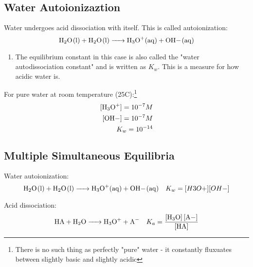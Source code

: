 \documentclass[../CHEM152Notes.tex]{subfiles}
\begin{document}
\subsection*{Water Autoionizaztion}
Water undergoes acid dissociation with itself. This is called autoionization:
\begin{equation*}
    \begin{aligned}
        \ce{H2O_(l) + H2O_(l) -> H3O+_(aq) + OH-_(aq)}
    \end{aligned}
\end{equation*}
\begin{enumerate}
    \item The equilibrium constant in this case is also called the "water autodissociation constant" and is written as $K_w$. This is a measure for how acidic water is.
\end{enumerate}
For pure water at room temperature (25C):\footnote{There is no such thing as perfectly "pure" water - it constantly fluxuates between slightly basic and slightly acidic} 
\begin{equation*}
    \begin{aligned}
        \ce{[H3O+]} = 10^{-7} M \\
        \ce{[OH-]} = 10^{-7} M \\
        K_w = 10^{-14}
    \end{aligned}
\end{equation*}



\subsection*{Multiple Simultaneous Equilibria}
Water autoionization:
\begin{equation*}
    \begin{aligned}
        \ce{H2O_(l) + H2O_(l) -> H3O+_(aq) + OH-_(aq)} \quad K_w = [H3O+][OH-]
    \end{aligned}
\end{equation*}

Acid dissociation: 
\begin{equation*}
    \begin{aligned}
        \ce{HA + H2O -> H3O+ + A-} \quad K_a = \ce{\frac{[H3O] [A-]}{[HA]}}
    \end{aligned}
\end{equation*}
\end{document}
